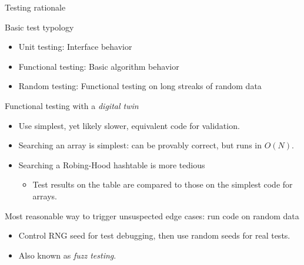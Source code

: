 \begin{frame}[fragile]{Testing rationale}

  Basic test typology
  \begin{itemize}
  \item Unit testing: Interface behavior
  \item Functional testing: Basic algorithm behavior
  \item Random testing: Functional testing on long streaks of random data
  \end{itemize}

  Functional testing with a {\em digital twin}
  \begin{itemize}
  \item Use simplest, yet likely slower, equivalent code for validation.
  \item Searching an array is simplest: can be provably correct, but runs in $O(N)$.
  \item Searching a Robing-Hood hashtable is more tedious
    \begin{itemize}
    \item Test results on the table are compared to those on the simplest code for arrays.
    \end{itemize}
  \end{itemize}
  
  Most reasonable way to trigger unsuspected edge cases: run code on random data
  \begin{itemize}
  \item Control RNG seed for test debugging, then use random seeds for real tests.
  \item Also known as {\em fuzz testing}.
  \end{itemize}

\end{frame}


